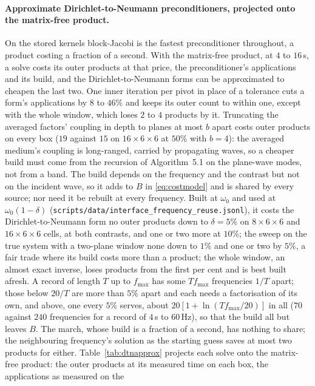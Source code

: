 \documentclass[11pt,a4paper]{article}
\begin{document}
\paragraph{Approximate Dirichlet-to-Neumann preconditioners, projected onto the matrix-free product.} On the stored
kernels block-Jacobi is the fastest preconditioner throughout, a product costing a fraction of a second. With the
matrix-free product, at $4$ to $16$\,s, a solve costs its outer products at that price, the preconditioner's
applications and its build, and the Dirichlet-to-Neumann forms can be approximated to cheapen the last two. One
inner iteration per pivot in place of a tolerance cuts a form's applications by $8$ to $46\%$ and keeps its outer
count to within one, except with the whole window, which loses $2$ to $4$ products by it. Truncating the averaged
factors' coupling in depth to planes at most $b$ apart costs outer products on every box ($19$ against $15$ on
$16\times6\times6$ at $50\%$ with $b=4$): the averaged medium's coupling is long-ranged, carried by propagating
waves, so a cheaper build must come from the recursion of Algorithm~5.1 on the plane-wave modes, not from a band.
The build depends on the frequency and the contrast but not on the incident wave, so it adds to $B$ in
\eqref{eq:costmodel} and is shared by every source; nor need it be rebuilt at every frequency. Built at
$\omega_0$ and used at $\omega_0(1-\delta)$ (\texttt{scripts/data/interface\_frequency\_reuse.jsonl}), it costs the
Dirichlet-to-Neumann form no outer products down to $\delta=5\%$ on $8\times6\times6$ and $16\times6\times6$ cells,
at both contrasts, and one or two more at $10\%$; the sweep on the true system with a two-plane window none down to
$1\%$ and one or two by $5\%$, a fair trade where its build costs more than a product; the whole window, an almost
exact inverse, loses products from the first per cent and is best built afresh. A record of length $T$ up to
$f_{\max}$ has some $Tf_{\max}$ frequencies $1/T$ apart; those below $20/T$ are more than $5\%$ apart and each
needs a factorisation of its own, and above, one every $5\%$ serves, about $20[1+\ln(Tf_{\max}/20)]$ in all ($70$
against $240$ frequencies for a record of $4$\,s to $60$\,Hz), so that the build all but leaves $B$. The march,
whose build is a fraction of a second, has nothing to share; the neighbouring frequency's solution as the starting
guess saves at most two products for either. Table~\ref{tab:dtnapprox} projects each solve onto the
matrix-free product: the outer products at its measured time on each box, the applications as measured on the
\end{document}
